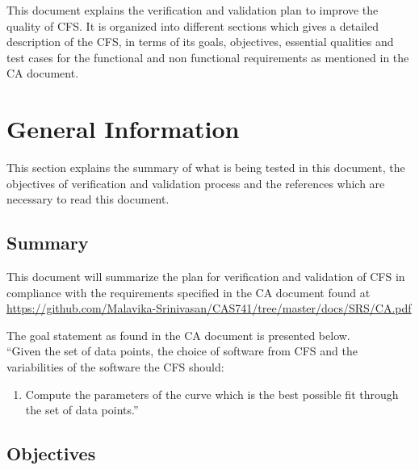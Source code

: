 \documentclass[12pt, titlepage]{article}
\newcommand{\famname}{CFS} %
\begin{document}


\newpage



This document explains the verification and validation plan to improve the 
quality of \famname{}. It is organized into different sections which gives a 
detailed description of the \famname{}, in terms of its goals, objectives, 
essential qualities and test cases for the functional and non functional 
requirements as mentioned in the CA document.



\section{General Information}

This section explains the summary of what is being tested in this document, the 
objectives of verification and validation process and the references which are 
necessary to read this document.


\subsection{Summary}

This document will summarize the plan for verification and validation of
\famname{} in compliance with the requirements specified in the CA document
found at
\sloppy
\url{https://github.com/Malavika-Srinivasan/CAS741/tree/master/docs/SRS/CA.pdf}

The goal statement as found in the CA document is presented below.\\
\noindent ``Given the set of data points, the choice of software from \famname{} and the variabilities of the software the \famname{} should:

\begin{enumerate}
	
	\item Compute the parameters of the curve which is the best possible fit 
	through the set of data points.''
\end{enumerate}


\subsection{Objectives}
\end{document}
